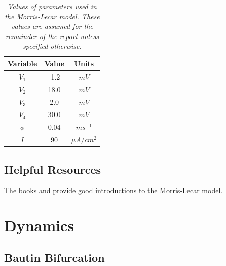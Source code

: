 \documentclass[letterpaper,12pt]{article}
\numberwithin{table}{section}
\numberwithin{figure}{section}
\numberwithin{equation}{section}
\newcommand{\ccaption}[1]{\caption{\textit{#1}}}
\begin{document}
\begin{flushleft}
\begin{table}[h]
\begin{subtable}{0.49\linewidth}
        \end{subtable}
        \begin{subtable}{0.49\linewidth}

            \centering

            \begin{tabular}{ | c | c | c | }
                \hline
                Variable & Value & Units \\
                \hline\hline
                $V_1$ & -1.2 & $mV$ \\
                \hline
                $V_2$ & 18.0 & $mV$ \\
                \hline
                $V_3$ & 2.0 & $mV$ \\
                \hline
                $V_4$ & 30.0 & $mV$ \\
                \hline
                $\phi$ & 0.04 & $ms^{-1}$ \\
                \hline
                $I$ & 90 & $\mu A/cm^2$ \\
                \hline

            \end{tabular}

        \end{subtable}

        \captionsetup{width=0.85\linewidth}
        \ccaption{Values of parameters used in the Morris-Lecar model. These values are assumed for the remainder of the report unless specified otherwise.}
        \label{tab:ml-param}

    \end{table}

    \subsection{Helpful Resources}
    The books \cite{snm} and \cite{ermentrout} provide good introductions to the Morris-Lecar model.

    \pagebreak

    \section{Dynamics}

    \subsection{Bautin Bifurcation}


\end{flushleft}
\end{document}
